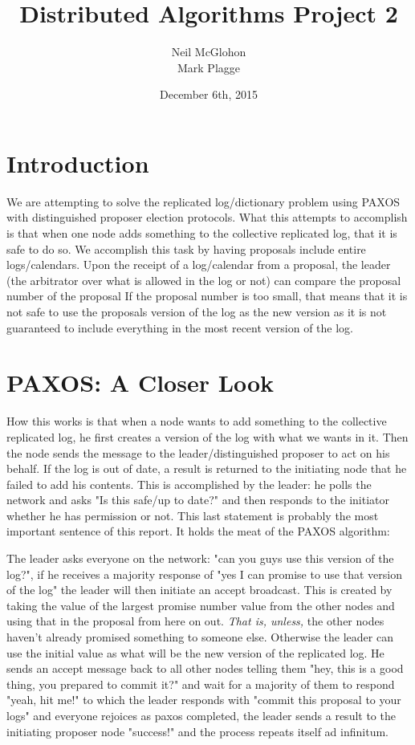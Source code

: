 \documentclass[11pt]{article} %
\title{	
\normalfont \large 
Distributed Algorithms Project 2 \\ %
}
\author{\small Neil McGlohon\\\small Mark Plagge} %
\date{December 6th, 2015} %
\begin{document}
\maketitle %


\section{Introduction}
We are attempting to solve the replicated log/dictionary problem using PAXOS with distinguished proposer election protocols. What this attempts to accomplish is that when one node adds something to the collective replicated log, that it is safe to do so. We accomplish this task by having proposals include entire logs/calendars. Upon the receipt of a log/calendar from a proposal, the leader (the arbitrator over what is allowed in the log or not) can compare the proposal number of the proposal If the proposal number is too small, that means that it is not safe to use the proposals version of the log as the new version as it is not guaranteed to include everything in the most recent version of the log. 

\section{PAXOS: A Closer Look}
How this works is that when a node wants to add something to the collective replicated log, he first creates a version of the log with what we wants in it. Then the node sends the message to the leader/distinguished proposer to act on his behalf. If the log is out of date, a result is returned to the initiating node that he failed to add his contents. This is accomplished by the leader: he polls the network and asks "Is this safe/up to date?" and then responds to the initiator whether he has permission or not. This last statement is probably the most important sentence of this report. It holds the meat of the PAXOS algorithm:

The leader asks everyone on the network: "can you guys use this version of the log?", if he receives a majority response of "yes I can promise to use that version of the log" the leader will then initiate an accept broadcast. This is created by taking the value of the largest promise number value from the other nodes and using that in the proposal from here on out. \emph{That is, unless,} the other nodes haven't already promised something to someone else. Otherwise the leader can use the initial value as what will be the new version of the replicated log. He sends an accept message back to all other nodes telling them "hey, this is a good thing, you prepared to commit it?" and wait for a majority of them to respond "yeah, hit me!" to which the leader responds with "commit this proposal to your logs" and everyone rejoices as paxos completed, the leader sends a result to the initiating proposer node "success!" and the process repeats itself ad infinitum.
\end{document}
